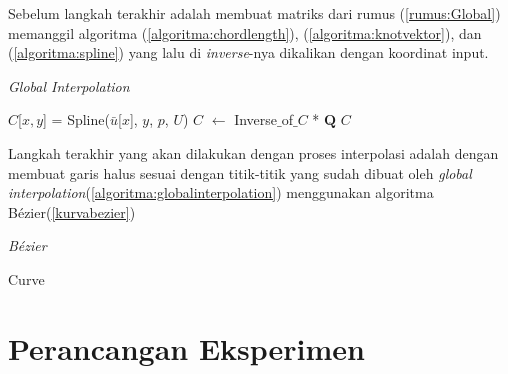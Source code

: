 Sebelum langkah terakhir adalah membuat matriks dari rumus (\ref{rumus:Global})
memanggil algoritma (\ref{algoritma:chordlength}), (\ref{algoritma:knotvektor}), 
dan (\ref{algoritma:spline}) yang lalu di \textit{inverse}-nya 
dikalikan dengan koordinat input.
\begin{algorithm}[H]
  \caption{\textit{Global Interpolation}}
  \begin{algorithmic}[1]
        \State $\textit{C}$[$x,y$] = Spline($\bar{u}$[$x$], $y$, $p$, $U$)
      \EndFor
    \EndFor
  \State $\textit{C}$ $\gets$ Inverse$\_$of$\_$$\textit{C}$ * $\textbf{Q}$
  \State \Return $\textit{C}$
  \EndFunction
  \end{algorithmic}
  \label{algoritma:globalinterpolation}
\end{algorithm}

Langkah terakhir yang akan dilakukan dengan proses interpolasi 
adalah dengan membuat garis halus sesuai dengan titik-titik 
yang sudah dibuat oleh \textit{global interpolation}(\ref{algoritma:globalinterpolation}) 
menggunakan algoritma Bézier(\ref{kurvabezier})
\begin{algorithm}[H]
  \caption{\textit{Bézier}}
  \begin{algorithmic}
   
    \State {} 
  \EndFunction
    \EndFor
    \State \Return Curve
    \EndFunction
  \end{algorithmic}
  \label{algoritma:bezier}
\end{algorithm}


\section{Perancangan Eksperimen}

